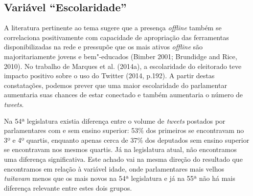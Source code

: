 \subsection{Variável ``Escolaridade''}

A literatura pertinente ao tema sugere que a presença \emph{offline} também se
correlaciona positivamente com capacidade de apropriação das ferramentas
disponibilizadas na rede e pressupõe que os mais ativos \emph{offline} são
majoritariamente jovens e bem"-educados (Bimber 2001; Brundidge and Rice,
2010). No trabalho de Marques et al. (2014a), a escolaridade do
eleitorado teve impacto positivo sobre o uso do Twitter (2014, p.192). A
partir destas constatações, podemos prever que uma maior escolaridade do
parlamentar aumentaria suas chances de estar conectado e também
aumentaria o número de \emph{tweets}.

Na 54ª legislatura existia diferença entre o volume de \emph{tweets}
postados por parlamentares com e sem ensino superior: 53\% dos primeiros
se encontravam no 3º e 4º quartis, enquanto apenas cerca de 37\% dos
deputados sem ensino superior se encontravam nos mesmos quartis. Já na
legislatura atual, não encontramos uma diferença significativa. Este
achado vai na mesma direção do resultado que encontramos em relação à
variável idade, onde parlamentares mais velhos \emph{tuitavam} menos que
os mais novos na 54ª legislatura e já na 55ª não há mais diferença
relevante entre estes dois grupos.

